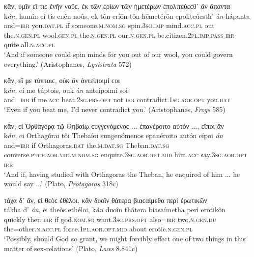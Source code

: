 \begin{exe}
\ex κἄν, ὑμῖν εἴ τιϲ ἐνῆν νοῦϲ, ἐκ τῶν ἐρίων τῶν ἡμετέρων ἐπολιτεύεϲθ᾽ ἂν ἅπαντα\\
\gll k\emph{án}, humîn eí tis enên noûs, ek tôn eríōn tôn hēmetérōn epoliteúesth' \emph{àn} hápanta\\
and=\textsc{irr} you.\textsc{dat.pl} if someone.\textsc{m.nom.sg} spin.\textsc{3sg.imp} mind.\textsc{acc.pl} out the.\textsc{n.gen.pl} wool.\textsc{gen.pl} the.\textsc{n.gen.pl} our.\textsc{n.gen.pl} be.citizen.\textsc{2pl.imp.pass} \textsc{irr} quite.all.\textsc{n.acc.pl}\\
\trans `And if someone could spin minds for you out of our wool, you could govern everything.' (Aristophanes, \textit{Lysistrata} 572)
\label{anrepeat6}
\end{exe}

\begin{exe}
\ex κἄν, εἴ με τύπτοιϲ, οὐκ ἂν ἀντείποιμί ϲοι\\
\gll k\emph{án}, eí me túptois, ouk \emph{àn} anteípoimí soi\\
and=\textsc{irr} if me.\textsc{acc} beat.\textsc{2sg.prs.opt} not \textsc{irr} contradict.\textsc{1sg.aor.opt} you.\textsc{dat}\\
\trans `Even if you beat me, I'd never contradict you.' (Aristophanes, \textit{Frogs} 585)
\label{anrepeat7}
\end{exe}

\begin{exe}
\ex κἄν, εἰ Ὀρθαγόρᾳ τῷ Θηβαίῳ ϲυγγενόμενοϲ ... ἐπανέροιτο αὐτόν ..., εἴποι ἄν\\
\gll k\emph{án}, ei Orthagórāi tôi Thēbaíōi sungenómenos epanéroito autón eípoi \emph{án}\\
and=\textsc{irr} if Orthagoras.\textsc{dat} the.\textsc{m.dat.sg} Theban.\textsc{dat.sg} converse.\textsc{ptcp.aor.mid.m.nom.sg} enquire.\textsc{3sg.aor.opt.mid} him.\textsc{acc} say.\textsc{3sg.aor.opt} \textsc{irr}\\
\trans `And if, having studied with Orthagoras the Theban, he enquired of him ... he would say ...' (Plato, \textit{Protagoras} 318c)
\label{anrepeat8}
\end{exe}

\begin{exe}
\ex τάχα δ᾽ ἄν, εἰ θεὸϲ ἐθέλοι, κἂν δυοῖν θάτερα βιαϲαίμεθα περὶ ἐρωτικῶν\\
\gll tákha d' \emph{án}, ei theòs ethéloi, k\emph{àn} duoîn thátera biasaímetha perì erōtikôn\\
quickly then \textsc{irr} if god.\textsc{nom.sg} want.\textsc{3sg.prs.opt} also=\textsc{irr} two.\textsc{n.gen.du} the=other.\textsc{n.acc.pl} force.\textsc{1pl.aor.opt.mid} about erotic.\textsc{n.gen.pl}\\
\trans `Possibly, should God so grant, we might forcibly effect one of two things in this matter of sex-relations' (Plato, \textit{Laws} 8.841c)
\label{anrepeat9}
\end{exe}

